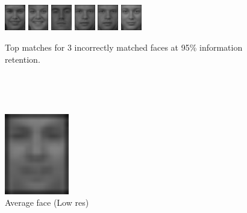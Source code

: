 \begin{figure}[hbt]
  \includegraphics[width=0.08\textwidth]{../results/H_rez/incorrect95/3/5.jpg}
  \includegraphics[width=0.08\textwidth]{../results/H_rez/incorrect95/3/6.jpg}
  \includegraphics[width=0.08\textwidth]{../results/H_rez/incorrect95/3/7.jpg}
  \includegraphics[width=0.08\textwidth]{../results/H_rez/incorrect95/3/8.jpg}
  \includegraphics[width=0.08\textwidth]{../results/H_rez/incorrect95/3/8.jpg}
  \includegraphics[width=0.08\textwidth]{../results/H_rez/incorrect95/3/10.jpg}
  \caption{Top matches for 3 incorrectly matched faces at 95\% information retention.}
  \label{fig:incorrect95}
\end{figure}

~\vfill

\clearpage

~\vfill

\begin{figure}[hbt]
  \centering
  \includegraphics[width=0.25\textwidth]{../results/L_rez/mean_face.jpg}
  \caption{Average face (Low res)}
  \label{fig:mean_l}
\end{figure}

